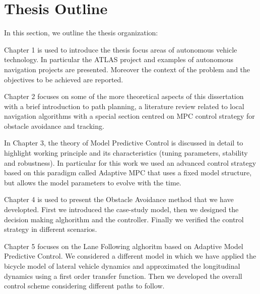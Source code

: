 \section{Thesis Outline}\label{sec:outline}

In this section, we outline the thesis organization: 

Chapter 1 is used to introduce the thesis focus areas of autonomous vehicle technology. In particular the ATLAS project and examples of autonomous navigation projects are presented. Moreover the context of the problem and the objectives to be achieved are reported.

Chapter 2 focuses on some of the more theoretical aspects of this dissertation with a brief introduction to path planning, a literature review related to local navigation algorithms with a special section centred on MPC control strategy for obstacle avoidance and tracking.

In Chapter 3, the theory of Model Predictive Control is discussed in detail to highlight working principle and its characteristics (tuning parameters, stability and robustness). In particular for this work we used an advanced control strategy based on this paradigm called Adaptive MPC that uses a fixed model structure, but allows the model parameters to evolve with the time.

Chapter 4 is used to present the Obstacle Avoidance method that we have developted. First we introduced the case-study model, then we designed the decision making alghorithm and the controller. Finally we verified the control strategy in different scenarios.

Chapter 5 focuses on the Lane Following alghoritm based on Adaptive Model Predictive Control. We considered a different model in which we have applied the bicycle model of lateral vehicle dynamics and approximated the longitudinal dynamics using a first order transfer function. Then we developed the overall control scheme considering different paths to follow.
